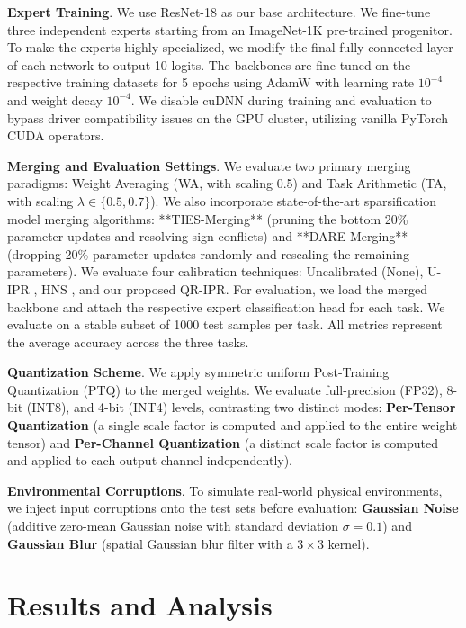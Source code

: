 \documentclass{article}
\theoremstyle{plain}
\theoremstyle{definition}
\theoremstyle{remark}
\begin{document}
\textbf{Expert Training}. We use ResNet-18 \cite{he2016deep} as our base architecture. We fine-tune three independent experts starting from an ImageNet-1K pre-trained progenitor. To make the experts highly specialized, we modify the final fully-connected layer of each network to output 10 logits. The backbones are fine-tuned on the respective training datasets for 5 epochs using AdamW \cite{loshchilov2017decoupled} with learning rate $10^{-4}$ and weight decay $10^{-4}$. We disable cuDNN during training and evaluation to bypass driver compatibility issues on the GPU cluster, utilizing vanilla PyTorch CUDA operators.

\textbf{Merging and Evaluation Settings}. We evaluate two primary merging paradigms: Weight Averaging (WA, with scaling 0.5) and Task Arithmetic (TA, with scaling $\lambda \in \{0.5, 0.7\}$). We also incorporate state-of-the-art sparsification model merging algorithms: **TIES-Merging** \cite{yadav2023ties} (pruning the bottom 20\% parameter updates and resolving sign conflicts) and **DARE-Merging** \cite{yu2024language} (dropping 20\% parameter updates randomly and rescaling the remaining parameters). We evaluate four calibration techniques: Uncalibrated (None), U-IPR \cite{submission9}, HNS \cite{submission7}, and our proposed QR-IPR.
For evaluation, we load the merged backbone and attach the respective expert classification head for each task. We evaluate on a stable subset of 1000 test samples per task. All metrics represent the average accuracy across the three tasks.

\textbf{Quantization Scheme}. We apply symmetric uniform Post-Training Quantization (PTQ) to the merged weights. We evaluate full-precision (FP32), 8-bit (INT8), and 4-bit (INT4) levels, contrasting two distinct modes: \textbf{Per-Tensor Quantization} (a single scale factor is computed and applied to the entire weight tensor) and \textbf{Per-Channel Quantization} (a distinct scale factor is computed and applied to each output channel independently).

\textbf{Environmental Corruptions}. To simulate real-world physical environments, we inject input corruptions onto the test sets before evaluation: \textbf{Gaussian Noise} (additive zero-mean Gaussian noise with standard deviation $\sigma = 0.1$) and \textbf{Gaussian Blur} (spatial Gaussian blur filter with a $3 \times 3$ kernel).

\vspace{-2.0mm}
\section{Results and Analysis}
\label{sec:results}
\vspace{-2.5mm}
\end{document}
